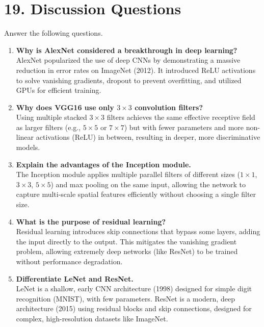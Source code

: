 \documentclass[11pt]{article}
\begin{document}

\section*{19. Discussion Questions}

Answer the following questions.

\begin{enumerate}
\item \textbf{Why is AlexNet considered a breakthrough in deep learning?}\\
AlexNet popularized the use of deep CNNs by demonstrating a massive reduction in error rates on ImageNet (2012). It introduced ReLU activations to solve vanishing gradients, dropout to prevent overfitting, and utilized GPUs for efficient training.

\item \textbf{Why does VGG16 use only $3\times3$ convolution filters?}\\
Using multiple stacked $3\times3$ filters achieves the same effective receptive field as larger filters (e.g., $5\times5$ or $7\times7$) but with fewer parameters and more non-linear activations (ReLU) in between, resulting in deeper, more discriminative models.

\item \textbf{Explain the advantages of the Inception module.}\\
The Inception module applies multiple parallel filters of different sizes ($1\times1$, $3\times3$, $5\times5$) and max pooling on the same input, allowing the network to capture multi-scale spatial features efficiently without choosing a single filter size.

\item \textbf{What is the purpose of residual learning?}\\
Residual learning introduces skip connections that bypass some layers, adding the input directly to the output. This mitigates the vanishing gradient problem, allowing extremely deep networks (like ResNet) to be trained without performance degradation.

\item \textbf{Differentiate LeNet and ResNet.}\\
LeNet is a shallow, early CNN architecture (1998) designed for simple digit recognition (MNIST), with few parameters. ResNet is a modern, deep architecture (2015) using residual blocks and skip connections, designed for complex, high-resolution datasets like ImageNet.


\end{enumerate}
\end{document}
